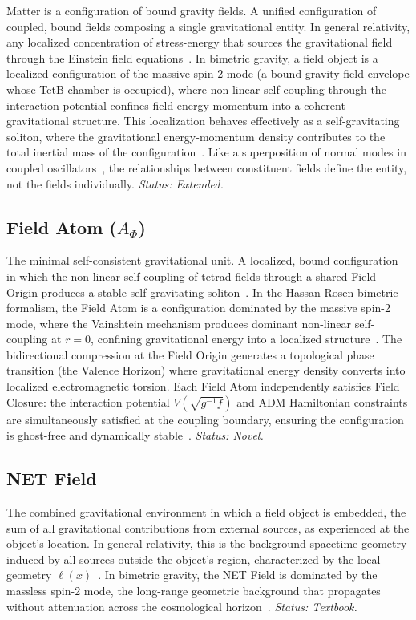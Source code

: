 \documentclass[aps,prd,preprint,superscriptaddress,showpacs,preprintnumbers,amsmath,amssymb,nofootinbib]{revtex4-2}
\begin{document}
Matter is a configuration of bound gravity fields. A unified configuration of coupled, bound fields composing a single gravitational entity. In general relativity, any localized concentration of stress-energy that sources the gravitational field through the Einstein field equations~\cite{mtw1973}. In bimetric gravity, a field object is a localized configuration of the massive spin-2 mode (a bound gravity field envelope whose TetB chamber is occupied), where non-linear self-coupling through the interaction potential confines field energy-momentum into a coherent gravitational structure. This localization behaves effectively as a self-gravitating soliton, where the gravitational energy-momentum density contributes to the total inertial mass of the configuration~\cite{hassan2012,wheeler1955}. Like a superposition of normal modes in coupled oscillators~\cite{goldstein2002,feynman1985}, the relationships between constituent fields define the entity, not the fields individually. \emph{Status: Extended.}

\subsection*{Field Atom ($A_\Phi$)}

The minimal self-consistent gravitational unit. A localized, bound configuration in which the non-linear self-coupling of tetrad fields through a shared Field Origin produces a stable self-gravitating soliton~\cite{wheeler1955}. In the Hassan-Rosen bimetric formalism, the Field Atom is a configuration dominated by the massive spin-2 mode, where the Vainshtein mechanism produces dominant non-linear self-coupling at $r = 0$, confining gravitational energy into a localized structure~\cite{hassan2012,vainshtein1972}. The bidirectional compression at the Field Origin generates a topological phase transition (the Valence Horizon) where gravitational energy density converts into localized electromagnetic torsion. Each Field Atom independently satisfies Field Closure: the interaction potential $V(\sqrt{g^{-1}f})$ and ADM Hamiltonian constraints are simultaneously satisfied at the coupling boundary, ensuring the configuration is ghost-free and dynamically stable~\cite{adm1962}. \emph{Status: Novel.}

\subsection*{NET Field}

The combined gravitational environment in which a field object is embedded, the sum of all gravitational contributions from external sources, as experienced at the object's location. In general relativity, this is the background spacetime geometry induced by all sources outside the object's region, characterized by the local geometry $\ell(x)$~\cite{mtw1973}. In bimetric gravity, the NET Field is dominated by the massless spin-2 mode, the long-range geometric background that propagates without attenuation across the cosmological horizon~\cite{hassan2012}. \emph{Status: Textbook.}
\end{document}
